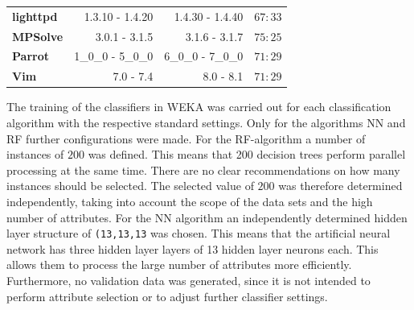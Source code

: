 \begin{table}[t]
\begin{tabular}{lrrr}
\textbf{lighttpd} & 1.3.10 - 1.4.20                                                     & 1.4.30 - 1.4.40                                                 & $67:33$                                               \\
\textbf{MPSolve}  & 3.0.1 - 3.1.5                                                       & 3.1.6 - 3.1.7                                                   & $75:25$                                               \\
\textbf{Parrot}   & 1\_0\_0 - 5\_0\_0                                                   & 6\_0\_0 - 7\_0\_0                                               & $71:29$                                               \\
\textbf{Vim}      & 7.0 - 7.4                                                           & 8.0 - 8.1                                                       & $71:29$                                               \\ \hline
\end{tabular}
\end{table}

The training of the classifiers in WEKA was carried out for each classification algorithm with the respective standard settings. Only for the algorithms NN and RF further configurations were made. For the RF-algorithm a number of instances of $200$ was defined. This means that 200 decision trees perform parallel processing at the same time. There are no clear recommendations on how many instances should be selected. The selected value of $200$ was therefore determined independently, taking into account the scope of the data sets and the high number of attributes. For the NN algorithm an independently determined hidden layer structure of \texttt{(13,13,13} was chosen. This means that the artificial neural network has three hidden layer layers of 13 hidden layer neurons each. This allows them to process the large number of attributes more efficiently. Furthermore, no validation data was generated, since it is not intended to perform attribute selection or to adjust further classifier settings.

